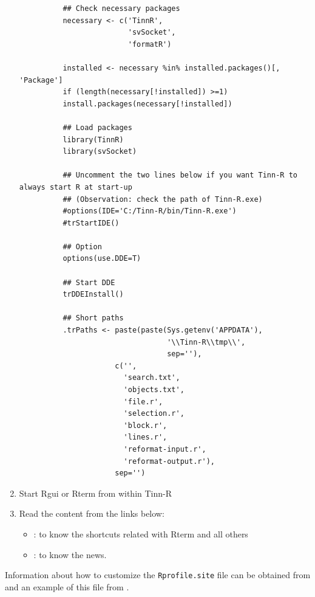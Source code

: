 \begin{enumerate}
{{\begin{verbatim}
          ## Check necessary packages
          necessary <- c('TinnR',
                         'svSocket',
                         'formatR')

          installed <- necessary %in% installed.packages()[, 'Package']
          if (length(necessary[!installed]) >=1)
          install.packages(necessary[!installed])

          ## Load packages
          library(TinnR)
          library(svSocket)

          ## Uncomment the two lines below if you want Tinn-R to always start R at start-up
          ## (Observation: check the path of Tinn-R.exe)
          #options(IDE='C:/Tinn-R/bin/Tinn-R.exe')
          #trStartIDE()

          ## Option
          options(use.DDE=T)

          ## Start DDE
          trDDEInstall()

          ## Short paths
          .trPaths <- paste(paste(Sys.getenv('APPDATA'),
                                  '\\Tinn-R\\tmp\\',
                                  sep=''),
                      c('',
                        'search.txt',
                        'objects.txt',
                        'file.r',
                        'selection.r',
                        'block.r',
                        'lines.r',
                        'reformat-input.r',
                        'reformat-output.r'),
                      sep='')
        \end{verbatim}
      } %
    } %
  \item Start Rgui or Rterm from within Tinn-R
  \item Read the content from the links below:
    \begin{itemize}
      \item \textit{}: to know
        the shortcuts related with Rterm and all others
      \item \textit{}:
        to know the news.
    \end{itemize}
\end{enumerate}


Information about how to customize the \texttt{Rprofile.site} file can be obtained from
and an example of this file from .


